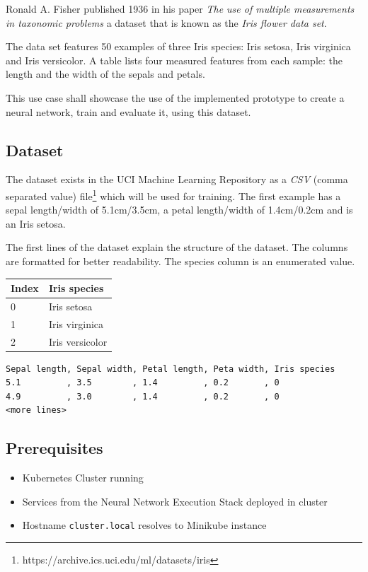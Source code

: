 Ronald A. Fisher published 1936 in his paper \emph{The use of multiple
measurements in taxonomic problems} \cite{fisher} a dataset that is
known as the \emph{Iris flower data set}.

The data set \cite{fisher} features 50 examples of three Iris species:
Iris setosa, Iris virginica and Iris versicolor. A table lists four
measured features from each sample: the length and the width of the
sepals and petals.

This use case shall showcase the use of the implemented prototype to
create a neural network, train and evaluate it, using this dataset.

\subsection{Dataset}\label{dataset}

The dataset exists in the UCI Machine Learning Repository
\cite{uci-iris} as a \emph{CSV} (comma separated value) file\footnote{https://archive.ics.uci.edu/ml/datasets/iris}
which will be used for training. The first example has a sepal
length/width of 5.1cm/3.5cm, a petal length/width of 1.4cm/0.2cm and is
an Iris setosa.

The first lines of the dataset explain the structure of the dataset. The
columns are formatted for better readability. The species column is an
enumerated value.

\begin{longtable}[]{@{}ll@{}}
\toprule
Index & Iris species\tabularnewline
\midrule
\endhead
0 & Iris setosa\tabularnewline
1 & Iris virginica\tabularnewline
2 & Iris versicolor\tabularnewline
\bottomrule
\end{longtable}

\begin{verbatim}
Sepal length, Sepal width, Petal length, Peta width, Iris species
5.1         , 3.5        , 1.4         , 0.2       , 0
4.9         , 3.0        , 1.4         , 0.2       , 0
<more lines>
\end{verbatim}

\subsection{Prerequisites}\label{prerequisites-4}

\begin{itemize}
\tightlist
\item
  Kubernetes Cluster running
\item
  Services from the Neural Network Execution Stack deployed in cluster
\item
  Hostname \texttt{cluster.local} resolves to Minikube instance
\end{itemize}


